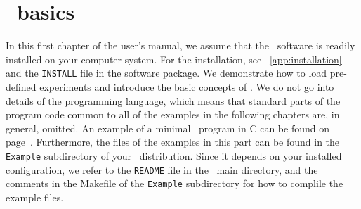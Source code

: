 \chapter{\GLOBES\ basics}
\label{chapt:gettingstarted}

In this first chapter of the user's manual, we assume that the \GLOBES\ software is readily installed on your computer system. For the installation,
see \App~\ref{app:installation} and the {\tt INSTALL} file in the
software package. We demonstrate how to load pre-defined experiments 
and introduce the basic concepts of \GLOBES . We do not go
into details of the programming language, which means that standard parts
of the program code common to all of the examples in the following chapters are, in general, omitted.
An example of a minimal \GLOBES\ program in C can be found on page~\pageref{ex:c}. Furthermore, the files of the examples in this part can be found in the {\tt Example} subdirectory of your \GLOBES\ distribution.  Since it depends on your installed
configuration, we refer to the {\tt README} file in the \GLOBES\ main directory, and the comments in the Makefile of the {\tt Example} subdirectory for how to complile the example files.

